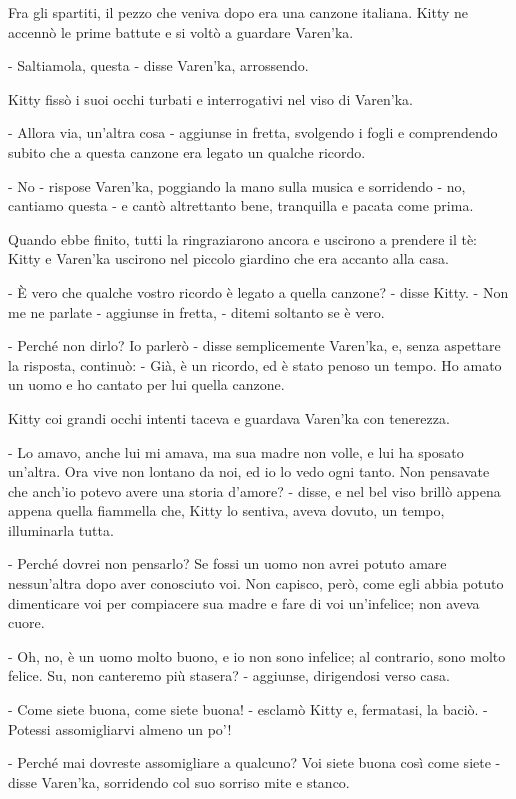 Fra gli spartiti, il pezzo che veniva dopo era una canzone italiana. Kitty ne accennò le prime battute e si voltò a guardare Varen'ka. 

- Saltiamola, questa - disse Varen'ka, arrossendo. 

Kitty fissò i suoi occhi turbati e interrogativi nel viso di Varen'ka. 

- Allora via, un'altra cosa - aggiunse in fretta, svolgendo i fogli e comprendendo subito che a questa canzone era legato un qualche ricordo. 

- No - rispose Varen'ka, poggiando la mano sulla musica e sorridendo - no, cantiamo questa - e cantò altrettanto bene, tranquilla e pacata come prima. 

Quando ebbe finito, tutti la ringraziarono ancora e uscirono a prendere il tè: Kitty e Varen'ka uscirono nel piccolo giardino che era accanto alla casa. 

- È vero che qualche vostro ricordo è legato a quella canzone? - disse Kitty. - Non me ne parlate - aggiunse in fretta, - ditemi soltanto se è vero. 

- Perché non dirlo? Io parlerò - disse semplicemente Varen'ka, e, senza aspettare la risposta, continuò: - Già, è un ricordo, ed è stato penoso un tempo. Ho amato un uomo e ho cantato per lui quella canzone. 

Kitty coi grandi occhi intenti taceva e guardava Varen'ka con tenerezza. 

- Lo amavo, anche lui mi amava, ma sua madre non volle, e lui ha sposato un'altra. Ora vive non lontano da noi, ed io lo vedo ogni tanto. Non pensavate che anch'io potevo avere una storia d'amore? - disse, e nel bel viso brillò appena appena quella fiammella che, Kitty lo sentiva, aveva dovuto, un tempo, illuminarla tutta. 

- Perché dovrei non pensarlo? Se fossi un uomo non avrei potuto amare nessun'altra dopo aver conosciuto voi. Non capisco, però, come egli abbia potuto dimenticare voi per compiacere sua madre e fare di voi un'infelice; non aveva cuore. 

- Oh, no, è un uomo molto buono, e io non sono infelice; al contrario, sono molto felice. Su, non canteremo più stasera? - aggiunse, dirigendosi verso casa. 

- Come siete buona, come siete buona! - esclamò Kitty e, fermatasi, la baciò. - Potessi assomigliarvi almeno un po'! 

- Perché mai dovreste assomigliare a qualcuno? Voi siete buona così come siete - disse Varen'ka, sorridendo col suo sorriso mite e stanco. 

